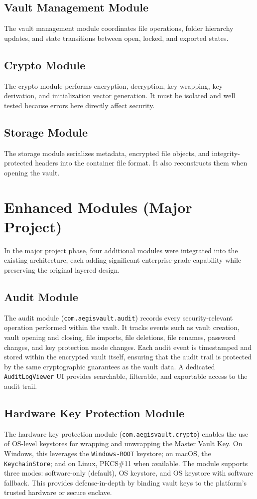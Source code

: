 \subsection{Vault Management Module}
The vault management module coordinates file operations, folder hierarchy updates, and state transitions between open, locked, and exported states.

\subsection{Crypto Module}
The crypto module performs encryption, decryption, key wrapping, key derivation, and initialization vector generation. It must be isolated and well tested because errors here directly affect security.

\subsection{Storage Module}
The storage module serializes metadata, encrypted file objects, and integrity-protected headers into the container file format. It also reconstructs them when opening the vault.

\section{Enhanced Modules (Major Project)}
In the major project phase, four additional modules were integrated into the existing architecture, each adding significant enterprise-grade capability while preserving the original layered design.

\subsection{Audit Module}
The audit module (\texttt{com.aegisvault.audit}) records every security-relevant operation performed within the vault. It tracks events such as vault creation, vault opening and closing, file imports, file deletions, file renames, password changes, and key protection mode changes. Each audit event is timestamped and stored within the encrypted vault itself, ensuring that the audit trail is protected by the same cryptographic guarantees as the vault data. A dedicated \texttt{AuditLogViewer} UI provides searchable, filterable, and exportable access to the audit trail.

\subsection{Hardware Key Protection Module}
The hardware key protection module (\texttt{com.aegisvault.crypto}) enables the use of OS-level keystores for wrapping and unwrapping the Master Vault Key. On Windows, this leverages the \texttt{Windows-ROOT} keystore; on macOS, the \texttt{KeychainStore}; and on Linux, PKCS\#11 when available. The module supports three modes: software-only (default), OS keystore, and OS keystore with software fallback. This provides defense-in-depth by binding vault keys to the platform's trusted hardware or secure enclave.

